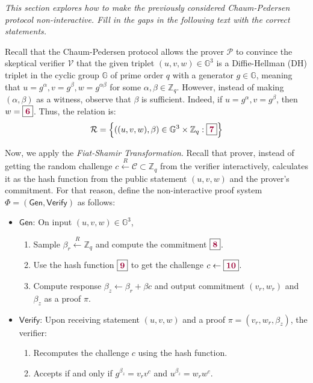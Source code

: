 \documentclass[../lecture-notes.tex]{subfiles}
\begin{document}
\begin{tcolorbox}[colback=gray!10!white,fonttitle=\bfseries,colframe=purple!80!black,title=Exercises 6-10. Non-Interactive Chaum-Pedersen Protocol.]
    \textit{This section explores how to make the previously considered Chaum-Pedersen protocol non-interactive. Fill in the gaps in the following text with the correct statements.}
    \vspace{10px}

    Recall that the Chaum-Pedersen protocol allows the prover $\mathcal{P}$ to convince the skeptical verifier $\mathcal{V}$ that the given triplet $(u,v,w) \in \mathbb{G}^3$ is a Diffie-Hellman (DH) triplet in the cyclic group $\mathbb{G}$ of prime order $q$ with a generator $g \in \mathbb{G}$, meaning that $u=g^{\alpha},v=g^{\beta},w=g^{\alpha\beta}$ for some $\alpha,\beta \in \mathbb{Z}_q$. However, instead of making $(\alpha,\beta)$ as a witness, observe that $\beta$ is sufficient. Indeed, if $u=g^{\alpha},v=g^{\beta}$, then $w=\boxed{\textcolor{purple!80!black}{\textbf{6}}}$. Thus, the relation is:
    \begin{equation*}
        \mathcal{R} = \left\{ ((u,v,w), \beta) \in \mathbb{G}^3 \times \mathbb{Z}_q: \boxed{\textcolor{purple!80!black}{\textbf{7}}} \right\}
    \end{equation*}

    Now, we apply the \textit{Fiat-Shamir Transformation}. Recall that prover, instead of getting the random challenge $c \xleftarrow{R} \mathcal{C} \subset \mathbb{Z}_q$ from the verifier interactively, calculates it as the hash function from the public statement $(u,v,w)$ and the prover's commitment. For that reason, define the non-interactive proof system $\Phi = (\mathsf{Gen}, \mathsf{Verify})$ as follows:
    \begin{itemize}
        \item $\mathsf{Gen}$: On input $(u,v,w) \in \mathbb{G}^3$, 
        \begin{enumerate}
            \item Sample $\beta_r \xleftarrow{R} \mathbb{Z}_q$ and compute the commitment $\boxed{\textcolor{purple!80!black}{\textbf{8}}}$.
            \item Use the hash function $\boxed{\textcolor{purple!80!black}{\textbf{9}}}$ to get the challenge $c \gets \boxed{\textcolor{purple!80!black}{\textbf{10}}}$.
            \item Compute response $\beta_z \gets \beta_r + \beta c$ and output commitment $(v_r,w_r)$ and $\beta_z$ as a proof $\pi$.
        \end{enumerate}
        \item $\mathsf{Verify}$: Upon receiving statement $(u,v,w)$ and a proof $\pi=(v_r,w_r,\beta_z)$, the verifier:
        \begin{enumerate}
            \item Recomputes the challenge $c$ using the hash function.
            \item Accepts if and only if $g^{\beta_z} = v_r v^c$ and $u^{\beta_z} = w_r w^c$.
        \end{enumerate}
    \end{itemize}


\end{tcolorbox}
\end{document}
